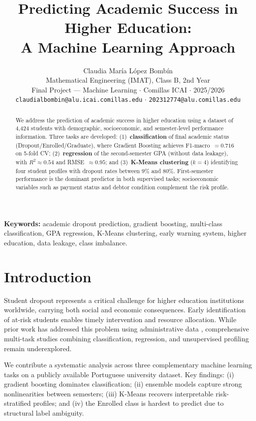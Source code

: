 \documentclass{article}
\title{Predicting Academic Success in Higher Education:\\A Machine Learning Approach}
\author{%
  Claudia Mar\'ia L\'opez Bomb\'in \\
  Mathematical Engineering (IMAT), Class B, 2nd Year \\
  Final Project --- Machine Learning $\cdot$ Comillas ICAI $\cdot$ 2025/2026 \\
  \texttt{claudialbombin@alu.icai.comillas.edu} $\cdot$ \texttt{202312774@alu.comillas.edu}
}
\begin{document}
\maketitle

\begin{abstract}
We address the prediction of academic success in higher education using a dataset of 4,424 students with demographic, socioeconomic, and semester-level performance information. Three tasks are developed: (1)~\textbf{classification} of final academic status (Dropout/Enrolled/Graduate), where Gradient Boosting achieves F1-macro~$= 0.716$ on 5-fold CV; (2)~\textbf{regression} of the second-semester GPA (without data leakage), with $R^2 \approx 0.54$ and RMSE~$\approx 0.95$; and (3)~\textbf{K-Means clustering} ($k=4$) identifying four student profiles with dropout rates between 9\% and 80\%. First-semester performance is the dominant predictor in both supervised tasks; socioeconomic variables such as payment status and debtor condition complement the risk profile.
\end{abstract}

\vspace{0.5em}
\noindent\textbf{Keywords:} academic dropout prediction, gradient boosting, multi-class classification, GPA regression, K-Means clustering, early warning system, higher education, data leakage, class imbalance.

\section{Introduction}

Student dropout represents a critical challenge for higher education institutions worldwide, carrying both social and economic consequences. Early identification of at-risk students enables timely intervention and resource allocation. While prior work has addressed this problem using administrative data \cite{realinho2022}, comprehensive multi-task studies combining classification, regression, and unsupervised profiling remain underexplored.

We contribute a systematic analysis across three complementary machine learning tasks on a publicly available Portuguese university dataset. Key findings: (i) gradient boosting dominates classification; (ii) ensemble models capture strong nonlinearities between semesters; (iii) K-Means recovers interpretable risk-stratified profiles; and (iv) the Enrolled class is hardest to predict due to structural label ambiguity.
\end{document}
